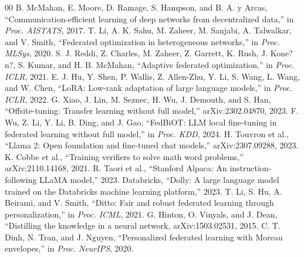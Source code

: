 \documentclass[conference]{IEEEtran}
\begin{document}
\balance
\begin{thebibliography}{00}
 B. McMahan, E. Moore, D. Ramage, S. Hampson, and B. A. y Arcas, ``Communication-efficient learning of deep networks from decentralized data,'' in \emph{Proc. AISTATS}, 2017.
 T. Li, A. K. Sahu, M. Zaheer, M. Sanjabi, A. Talwalkar, and V. Smith, ``Federated optimization in heterogeneous networks,'' in \emph{Proc. MLSys}, 2020.
 S. J. Reddi, Z. Charles, M. Zaheer, Z. Garrett, K. Rush, J. Kone?n?, S. Kumar, and H. B. McMahan, ``Adaptive federated optimization,'' in \emph{Proc. ICLR}, 2021.
 E. J. Hu, Y. Shen, P. Wallis, Z. Allen-Zhu, Y. Li, S. Wang, L. Wang, and W. Chen, ``LoRA: Low-rank adaptation of large language models,'' in \emph{Proc. ICLR}, 2022.
 G. Xiao, J. Lin, M. Seznec, H. Wu, J. Demouth, and S. Han, ``Offsite-tuning: Transfer learning without full model,'' arXiv:2302.04870, 2023.
 F. Wu, Z. Li, Y. Li, B. Ding, and J. Gao, ``FedBiOT: LLM local fine-tuning in federated learning without full model,'' in \emph{Proc. KDD}, 2024.
 H. Touvron et al., ``Llama 2: Open foundation and fine-tuned chat models,'' arXiv:2307.09288, 2023.
 K. Cobbe et al., ``Training verifiers to solve math word problems,'' arXiv:2110.14168, 2021.
 R. Taori et al., ``Stanford Alpaca: An instruction-following LLaMA model,'' 2023.
 Databricks, ``Dolly: A large language model trained on the Databricks machine learning platform,'' 2023.
 T. Li, S. Hu, A. Beirami, and V. Smith, ``Ditto: Fair and robust federated learning through personalization,'' in \emph{Proc. ICML}, 2021.
 G. Hinton, O. Vinyals, and J. Dean, ``Distilling the knowledge in a neural network, arXiv:1503.02531, 2015.
 C. T. Dinh, N. Tran, and J. Nguyen, ``Personalized federated learning with Moreau envelopes,'' in \emph{Proc. NeurIPS}, 2020.
\end{thebibliography}
\end{document}
